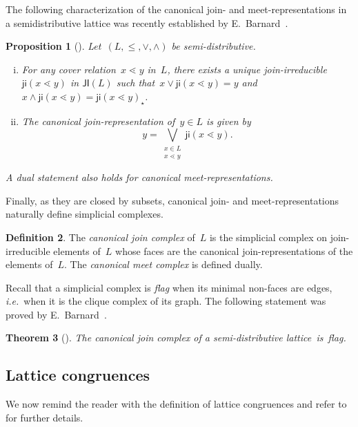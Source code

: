 \documentclass{memo-l}
\newtheorem{theorem}{Theorem}[part]
\newtheorem{proposition}[theorem]{Proposition}
\theoremstyle{definition}
\newtheorem{definition}[theorem]{Definition}
\newcommand{\ie}{\textit{i.e.}~} %
\newcommand{\darkblue}{\color{darkblue}} %
\newcommand{\defn}[1]{\textsl{\darkblue #1}} %
\newcommand{\meet}{\wedge} %
\newcommand{\join}{\vee} %
\newcommand{\bigJoin}{\bigvee} %
\newcommand{\JI}{\mathsf{JI}} %
\newcommand{\ji}{\mathsf{ji}} %
\begin{document}
The following characterization of the canonical join- and meet-representations in a semidistributive lattice was recently established by E.~Barnard~\cite{Barnard}.

\begin{proposition}[{\cite[Lem.~3.3]{Barnard}}]
\label{prop:canonicalJoinRepresentation}
Let~$(L,\le,\join,\meet)$ be semi-distributive.
\begin{enumerate}[(i)]
\item For any cover relation~$x \lessdot y$ in~$L$, there exists a unique join-irreducible ${\ji(x \lessdot y)}$ in $\JI(L)$ such that~$x \join \ji(x \lessdot y) = y$ and~$x \meet \ji(x \lessdot y) = \ji(x \lessdot y)_\star$.
\item The canonical join-representation of~$y \in L$ is given by
\[
y = \bigJoin_{\substack{x \in L \\ x \lessdot y}} \ji(x \lessdot y).
\]
\end{enumerate}
A dual statement also holds for canonical meet-representations.
\end{proposition}

Finally, as they are closed by subsets, canonical join- and meet-representations naturally define simplicial complexes.

\begin{definition}
The \defn{canonical join complex} of~$L$ is the simplicial complex on join-irreducible elements of~$L$ whose faces are the canonical join-representations of the elements of~$L$.
The \defn{canonical meet complex} is defined dually.
\end{definition}

Recall that a simplicial complex is \defn{flag} when its minimal non-faces are edges, \ie when it is the clique complex of its graph.
The following statement was proved by E.~Barnard~\cite{Barnard}.

\begin{theorem}[{\cite[Thm.~1.1]{Barnard}}]
The canonical join complex of a semi-distributive lattice~is~flag.
\end{theorem}

\subsection{Lattice congruences}
\label{sec:latticeTheory}

We now remind the reader with the definition of lattice congruences and refer to~\cite{Reading-LatticeCongruences, Reading-CambrianLattices} for further details.
\end{document}
